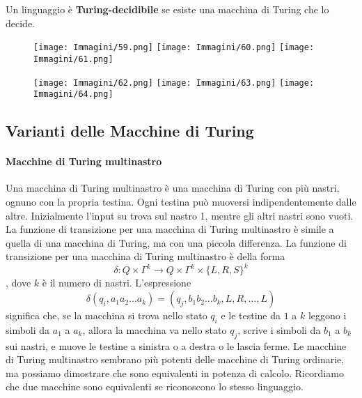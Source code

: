 \documentclass{article}
\begin{document}
\begin{tcolorbox}[colback=green!10!white, colframe=green!50!black, title=Definizione 3.6]
    Un linguaggio è \textbf{Turing-decidibile} se esiste una macchina di Turing che lo decide.
\end{tcolorbox}

\begin{figure}[H]
    \centering
    \texttt{[image: Immagini/59.png]}
    \texttt{[image: Immagini/60.png]}
    \texttt{[image: Immagini/61.png]}
    \label{fig:turing_machine_example2}
\end{figure}


\begin{figure}[H]
    \centering
    \texttt{[image: Immagini/62.png]}
    \texttt{[image: Immagini/63.png]}
    \texttt{[image: Immagini/64.png]}
    \label{fig:turing_machine_example2}
\end{figure}

\subsection{Varianti delle Macchine di Turing}
\paragraph{Macchine di Turing multinastro}
\label{def:multi_turing_machine}
\text{ }

Una macchina di Turing multinastro è una macchina di Turing con più nastri, ognuno con la propria testina.
Ogni testina può muoversi indipendentemente dalle altre.
Inizialmente l'input su trova sul nastro 1, mentre gli altri nastri sono vuoti.
La funzione di transizione per una macchina di Turing multinastro è simile a quella di una macchina di Turing, ma con una piccola differenza.
La funzione di transizione per una macchina di Turing multinastro è della forma 
$$
\delta: Q \times \Gamma^k \rightarrow Q \times \Gamma^k \times \{L,R,S\}^k
$$,
dove $k$ è il numero di nastri. L'espressione
$$
\delta(q_i,a_1a_2...a_k) = (q_j,b_1b_2...b_k,L,R,...,L)
$$
significa che, se la macchina si trova nello stato $q_i$ e le testine da $1$ a $k$ leggono i simboli da $a_1$ a $a_k$, allora la macchina va nello stato $q_j$, scrive i simboli da $b_1$ a $b_k$ sui nastri, e muove le testine a sinistra o a destra o le lascia ferme.
Le macchine di Turing multinastro sembrano più potenti delle macchine di Turing ordinarie, ma possiamo dimostrare che sono equivalenti in potenza di calcolo.
Ricordiamo che due macchine sono equivalenti se riconoscono lo stesso linguaggio.
\vspace{2em}
\end{document}
